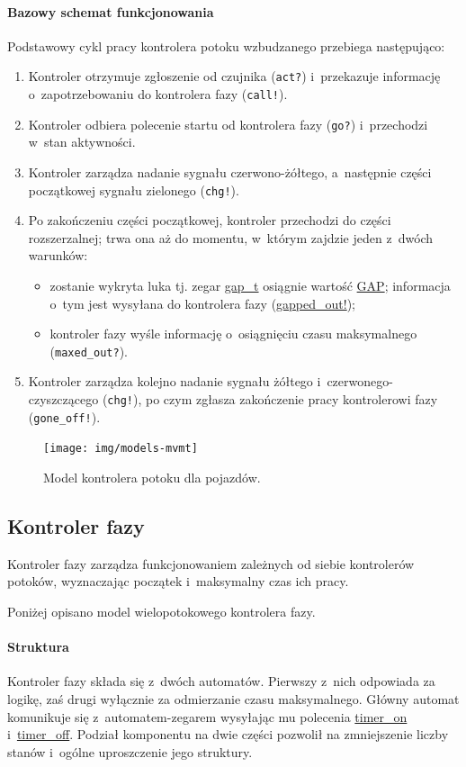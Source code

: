 \documentclass{pracamgr}
\theoremstyle{plain}
\begin{document}
\paragraph{Bazowy schemat funkcjonowania} Podstawowy cykl pracy
kontrolera potoku wzbudzanego przebiega następująco:
\begin{enumerate}
  \item Kontroler otrzymuje zgłoszenie od czujnika (\texttt{act?}) i~przekazuje
  informację o~zapotrzebowaniu do kontrolera fazy (\texttt{call!}).
  \item Kontroler odbiera polecenie startu od kontrolera fazy
  (\texttt{go?}) i~przechodzi w~stan aktywności.
  \item Kontroler zarządza nadanie sygnału czerwono-żółtego,
  a~następnie części początkowej sygnału zielonego (\texttt{chg!}).
  \item Po zakończeniu części początkowej, kontroler przechodzi do
  części rozszerzalnej; trwa ona aż do momentu, w~którym zajdzie jeden
  z~dwóch warunków:
  \begin{itemize}
    \item zostanie wykryta luka tj. zegar \url{gap_t} osiągnie wartość
    \url{GAP}; informacja o~tym jest wysyłana do kontrolera fazy
    (\url{gapped_out!});
    \item kontroler fazy wyśle informację o~osiągnięciu czasu
    maksymalnego (\texttt{maxed\_out?}).
  \end{itemize}
  \item Kontroler zarządza kolejno nadanie sygnału żółtego
  i~czerwonego-czyszczącego (\texttt{chg!}), po czym zgłasza zakończenie pracy
  kontrolerowi fazy (\texttt{gone\_off!}).
\end{enumerate}

\begin{figure}
  \centering
  \texttt{[image: img/models-mvmt]}
  \caption{Model kontrolera potoku dla pojazdów.}
  \label{img:mvmt-ctrl}
\end{figure}

\subsection{Kontroler fazy}
Kontroler fazy zarządza funkcjonowaniem zależnych od siebie
kontrolerów potoków, wyznaczając początek i~maksymalny czas ich pracy.

Poniżej opisano model wielopotokowego kontrolera fazy.
\paragraph{Struktura} Kontroler fazy składa się z~dwóch
automatów. Pierwszy z~nich odpowiada za logikę, zaś drugi wyłącznie za
odmierzanie czasu maksymalnego. Główny automat komunikuje się
z~automatem-zegarem wysyłając mu polecenia \url{timer_on}
i~\url{timer_off}. Podział komponentu na dwie części pozwolił na
zmniejszenie liczby stanów i~ogólne uproszczenie jego struktury.
\end{document}
